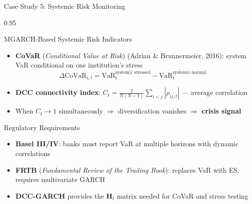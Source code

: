 \documentclass[9pt, aspectratio=169, t]{beamer}
\begin{document}
\begin{frame}{Case Study 5: Systemic Risk Monitoring}
    \begin{cminipage}{0.95\textwidth}
    {\footnotesize
    \begin{block}{MGARCH-Based Systemic Risk Indicators}
        \begin{itemize}\setlength{\itemsep}{0pt}
            \item \textbf{CoVaR} (\textit{Conditional Value at Risk}) (Adrian \& Brunnermeier, 2016): system VaR conditional on one institution's stress
            \[
                \Delta\text{CoVaR}_{i,t} = \text{VaR}_{t}^{\text{system} | i \text{ stressed}} - \text{VaR}_{t}^{\text{system} | i \text{ normal}}
            \]
            \item \textbf{DCC connectivity index}: $C_t = \frac{2}{N(N-1)}\sum_{i<j}|\rho_{ij,t}|$ --- average correlation
            \item When $C_t \rightarrow 1$ simultaneously $\Rightarrow$ diversification vanishes $\Rightarrow$ \textbf{crisis signal}
        \end{itemize}
    \end{block}
    \begin{alertblock}{Regulatory Requirements}
        \begin{itemize}\setlength{\itemsep}{0pt}
            \item \textbf{Basel III/IV}: banks must report VaR at multiple horizons with dynamic correlations
            \item \textbf{FRTB} (\textit{Fundamental Review of the Trading Book}): replaces VaR with ES, requires multivariate GARCH
            \item \textbf{DCC-GARCH} provides the $\mathbf{H}_t$ matrix needed for CoVaR and stress testing
        \end{itemize}
    \end{alertblock}
    }
    \end{cminipage}
\end{frame}
\end{document}
